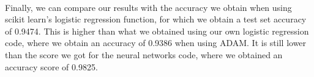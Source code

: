 \documentclass[english,notitlepage,reprint,nofootinbib]{revtex4-2}  %
\begin{document}
\vspace{3mm}
\\ 
Finally, we can compare our results with the accuracy we obtain when using scikit learn's logistic regression function, for which we obtain a test set accuracy of 0.9474. This is higher than what we obtained using our own logistic regression code, where we obtain an accuracy of 0.9386 when using ADAM. It is still lower than the score we got for the neural networks code, where we obtained an accuracy score of 0.9825. 
    









\end{document}
